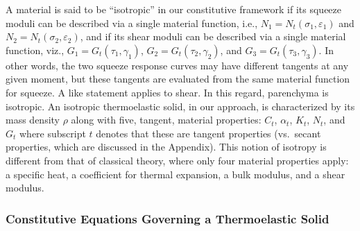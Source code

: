A material is said to be ``isotropic'' in our constitutive framework if its squeeze moduli can be described via a single material function, i.e., $N_1 = N_t (\sigma_1 , \varepsilon_1 )$ and $N_2 = N_t ( \sigma_2 , \varepsilon_2 )$, and if its shear moduli can be described via a single material function, viz., $G_1 = G_t ( \tau_1 , \gamma_1 )$, $G_2 = G_t ( \tau_2 , \gamma_2 )$, and $G_3 = G_t ( \tau_3 , \gamma_3 )$.  In other words, the two squeeze response curves may have different tangents at any given moment, but these tangents are evaluated from the same material function for squeeze.  A like statement applies to shear.  In this regard, parenchyma is isotropic.  An isotropic thermo\-elastic solid, in our approach, is characterized by its mass density $\rho$ along with five, tangent, material properties: $C_t$, $\alpha_t$, $K_t$, $N_t$, and $G_t$ where subscript $t$ denotes that these are tangent properties (vs.\ secant properties, which are discussed in the Appendix).  This notion of isotropy is different from that of classical theory, where only four material properties apply: a specific heat, a coefficient for thermal expansion, a bulk modulus, and a shear modulus.

\subsubsection{Constitutive Equations Governing a Thermoelastic Solid}

